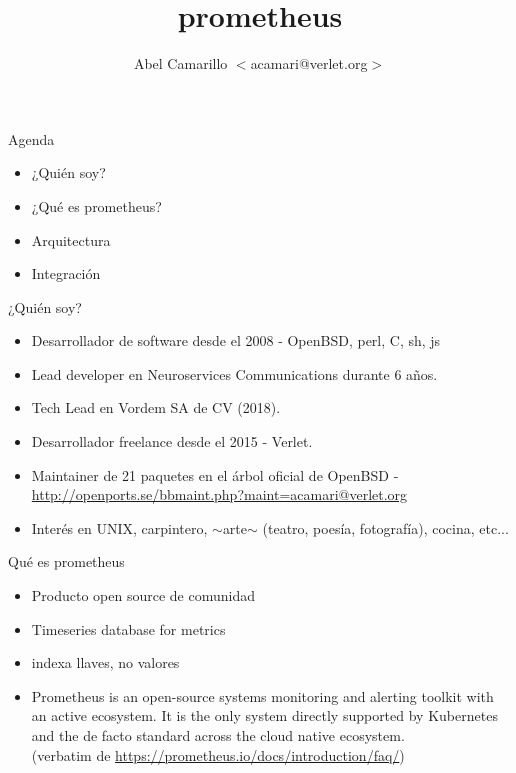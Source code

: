 \documentclass[11pt,spanish]{article}
\title{prometheus}
\author{Abel Camarillo $<$acamari@verlet.org$>$}
\newcommand{\fr}[1]{%
	\begin{flushright}
		#1
	\end{flushright}
}
\newcommand{\rowsp}[1][1em]{\vspace{#1}}
\newcommand{\hone}[1]{{\rowsp[0.3em]\noindent\Large #1 \rowsp[0.3em]}}
\newcommand{\myitm}[1]{\begin{itemize}#1\end{itemize}}
\begin{document}
\maketitle
\thispagestyle{empty}

\newpage

\hone{Agenda}

\myitm{
	\item ¿Quién soy?
	\item ¿Qué es prometheus?
	\item Arquitectura
	\item Integración
}

\newpage %
\hone{¿Quién soy?}
\begin{Row}
\begin{Cell}{2}
\myitm{
	\item Desarrollador de software desde el 2008 - OpenBSD, perl, C, sh, js
	\item Lead developer en Neuroservices Communications durante 6 años.
	\item Tech Lead en Vordem SA de CV (2018).
	\item Desarrollador freelance desde el 2015 - Verlet.
	\item Maintainer de 21 paquetes en el árbol oficial de OpenBSD -
	\href{http://openports.se/bbmaint.php?maint=acamari@verlet.org}{
	      http://openports.se/bbmaint.php?maint=acamari@verlet.org}
	\item Interés en UNIX, carpintero, $\sim$arte$\sim$ (teatro, poesía, fotografía), cocina, etc...
}
\end{Cell}


\end{Row}


\newpage %

\hone{Qué es prometheus}

\myitm{
	\item Producto open source de comunidad
	\item Timeseries database for metrics
	\item indexa llaves, no valores
	\item Prometheus is an open-source systems monitoring and alerting
		toolkit with an active ecosystem. It is the only system directly
		supported by Kubernetes and the de facto standard across the
		cloud native ecosystem. \\
		(verbatim de
		\href{https://prometheus.io/docs/introduction/faq/}{https://prometheus.io/docs/introduction/faq/})
}
\end{document}
